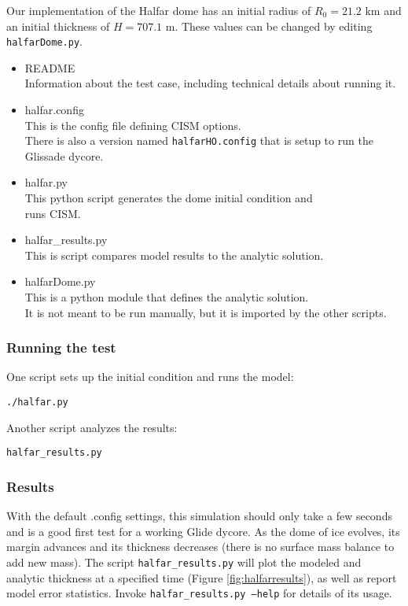 Our implementation of the Halfar dome has an initial radius of $R_0=21.2$ km and an initial thickness of $H=707.1$ m.
These values can be changed by editing \texttt{halfarDome.py}.

\begin{itemize}
	\item README \\
		Information about the test case, including technical details about running it.
	\item halfar.config \\
		This is the config file defining CISM options. \\
    There is also a version named \texttt{halfarHO.config} that is setup to run the Glissade dycore.
	\item halfar.py \\
		This python script generates the dome initial condition and \\
		runs CISM.
	\item halfar\_results.py \\
		This is script compares model results to the analytic solution.
	\item halfarDome.py \\
		This is a python module that defines the analytic solution. \\
    It is not meant to be run manually, but it is imported by the other scripts.
\end{itemize}

\subsubsection{Running the test}
One script sets up the initial condition and runs the model:

\texttt{./halfar.py}

Another script analyzes the results:

\texttt{halfar\_results.py}

\subsubsection{Results}
\label{subsecc:halfar_results}
With the default .config settings, this simulation should only take a few seconds and is a good first test for a working Glide dycore.
As the dome of ice evolves, its margin advances and its thickness decreases (there is no surface mass balance to add new mass).  The script \texttt{halfar\_results.py} will plot the modeled and analytic thickness at a specified time (Figure \ref{fig:halfarresults}), as well as report model error statistics.  Invoke \texttt{halfar\_results.py --help} for details of its usage.


